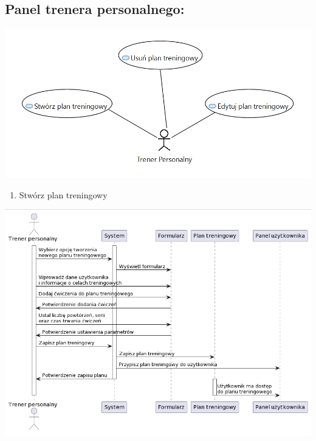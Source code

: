\documentclass[
]{article}
\providecommand{\tightlist}{%
  \setlength{\itemsep}{0pt}\setlength{\parskip}{0pt}}
\begin{document}
\hypertarget{h.9umzk2qmsz4g}{%
\subsection{\texorpdfstring{{Panel trenera
personalnego:}}{Panel trenera personalnego:}}\label{h.9umzk2qmsz4g}}

{\includegraphics{diagrams/use_cases/trener_personalny.png}}

\begin{enumerate}
\tightlist
\item
  {Stwórz plan treningowy}
\end{enumerate}

{\includegraphics{diagrams/sequence/tworzenie_planu_treningu.png}}
\end{document}
